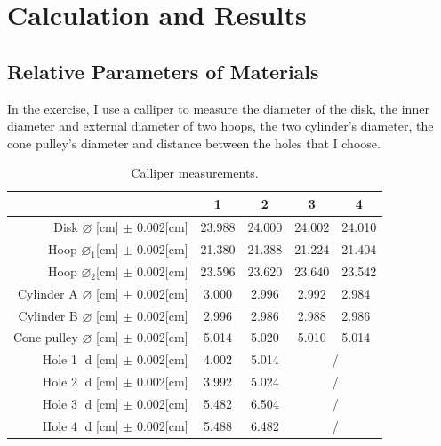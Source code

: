 \documentclass[12pt]{article}
\begin{document}
\section{Calculation and Results}
\subsection{Relative Parameters of Materials}
	In the exercise, I use a calliper to measure the diameter of the disk, the inner diameter and external diameter of two hoops, the two cylinder's diameter, the cone pulley's diameter and distance between the holes that I choose.
	\begin{table}[H]
\centering
\begin{tabular}{|r|c|c|c|l|}
\hline
\multicolumn{1}{|l|}{}                       & 1      & 2      & 3      & \multicolumn{1}{c|}{4} \\ \hline
Disk $\varnothing$ {[}cm{]} $\pm$ 0.002{[}cm{]}               & 23.988                 & 24.000                 & 24.002                 & 24.010 \\ \hline
Hoop $\varnothing_1${[}cm{]} $\pm$ 0.002{[}cm{]}             & 21.380                 & 21.388                 & 21.224                 & 21.404 \\ \hline
Hoop $\varnothing_2${[}cm{]} $\pm$ 0.002{[}cm{]}              & 23.596                 & 23.620                 & 23.640                 & 23.542 \\ \hline
Cylinder A $\varnothing$ {[}cm{]} $\pm$ 0.002{[}cm{]}         & 3.000                  & 2.996                  & 2.992                  & 2.984  \\ \hline
Cylinder B $\varnothing$ {[}cm{]} $\pm$ 0.002{[}cm{]}         & 2.996                  & 2.986                  & 2.988                  & 2.986  \\ \hline
Cone pulley $\varnothing$ {[}cm{]} $\pm$ 0.002{[}cm{]}        & 5.014                  & 5.020                  & 5.010                  & 5.014  \\ \hline
Hole \textcircled{1} d {[}cm{]} $\pm$ 0.002{[}cm{]}   & 4.002                  & 5.014                  & \multicolumn{2}{c|}{/}          \\ \hline
Hole \textcircled{2} d {[}cm{]} $\pm$ 0.002{[}cm{]} & 3.992                  & 5.024                  & \multicolumn{2}{c|}{/}          \\ \hline
Hole \textcircled{3} d {[}cm{]} $\pm$ 0.002{[}cm{]} & 5.482                  & 6.504                  & \multicolumn{2}{c|}{/}          \\ \hline
Hole \textcircled{4} d {[}cm{]} $\pm$ 0.002{[}cm{]} & 5.488                  & 6.482                  & \multicolumn{2}{c|}{/}          \\ \hline
\end{tabular}
\caption{Calliper measurements.}
\end{table}
\end{document}
